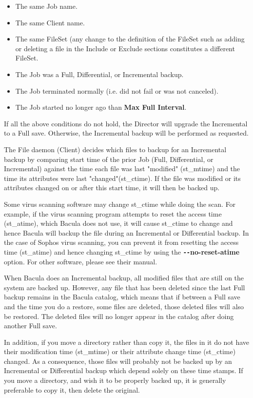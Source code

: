 \begin{description}
\begin{description}
\begin{itemize}
\item The same Job name.  
\item The same Client name.  
\item The same FileSet (any change to the definition of  the FileSet such as
   adding or deleting a file in the  Include or Exclude sections constitutes a
   different FileSet.  
\item The Job was a Full, Differential, or Incremental backup.  
\item The Job terminated normally (i.e. did not fail or was not  canceled).  
\item The Job started no longer ago than {\bf Max Full Interval}.
\end{itemize}

   If all the above conditions do not hold, the Director will upgrade  the
   Incremental to a Full save. Otherwise, the Incremental  backup will be
   performed as requested.  

   The File daemon (Client) decides which files to backup for an
   Incremental backup by comparing start time of the prior Job (Full,
   Differential, or Incremental) against the time each file was last
   "modified" (st\_mtime) and the time its attributes were last
   "changed"(st\_ctime).  If the file was modified or its attributes
   changed on or after this start time, it will then be backed up.

   Some virus scanning software may change st\_ctime while
   doing the scan.  For example, if the virus scanning program attempts to
   reset the access time (st\_atime), which Bacula does not use, it will
   cause st\_ctime to change and hence Bacula will backup the file during
   an Incremental or Differential backup.  In the case of Sophos virus
   scanning, you can prevent it from resetting the access time (st\_atime)
   and hence changing st\_ctime by using the {\bf \verb:--:no-reset-atime}
   option.  For other software, please see their manual.

   When Bacula does an Incremental backup, all modified files that are
   still on the system are backed up.  However, any file that has been
   deleted since the last Full backup remains in the Bacula catalog,
   which means that if between a Full save and the time you do a
   restore, some files are deleted, those deleted files will also be
   restored.  The deleted files will no longer appear in the catalog
   after doing another Full save.

   In addition, if you move a directory rather than copy it, the files in
   it do not have their modification time (st\_mtime) or their attribute
   change time (st\_ctime) changed.  As a consequence, those files will
   probably not be backed up by an Incremental or Differential backup which
   depend solely on these time stamps.  If you move a directory, and wish
   it to be properly backed up, it is generally preferable to copy it, then
   delete the original.


\end{description}
\end{description}
